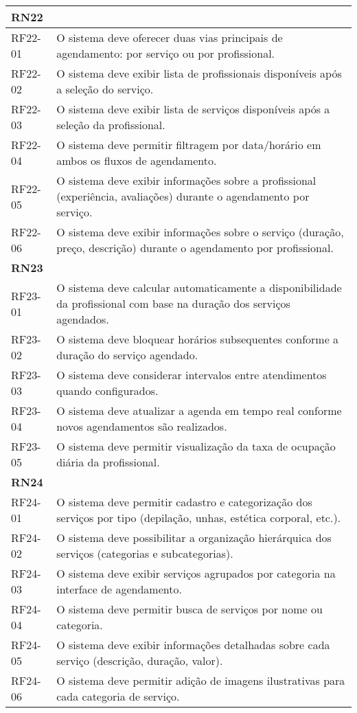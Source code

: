 \begin{longtable}{|p{}|p{}|}
	\multicolumn{2}{|l|}{\textbf{RN22}} \\ \hline
	RF22-01 & O sistema deve oferecer duas vias principais de agendamento: por serviço ou por profissional. \\ \hline
	RF22-02 & O sistema deve exibir lista de profissionais disponíveis após a seleção do serviço. \\ \hline
	RF22-03 & O sistema deve exibir lista de serviços disponíveis após a seleção da profissional. \\ \hline
	RF22-04 & O sistema deve permitir filtragem por data/horário em ambos os fluxos de agendamento. \\ \hline
	RF22-05 & O sistema deve exibir informações sobre a profissional (experiência, avaliações) durante o agendamento por serviço. \\ \hline
	RF22-06 & O sistema deve exibir informações sobre o serviço (duração, preço, descrição) durante o agendamento por profissional. \\ \hline
	
	\multicolumn{2}{|l|}{\textbf{RN23}} \\ \hline
	RF23-01 & O sistema deve calcular automaticamente a disponibilidade da profissional com base na duração dos serviços agendados. \\ \hline
	RF23-02 & O sistema deve bloquear horários subsequentes conforme a duração do serviço agendado. \\ \hline
	RF23-03 & O sistema deve considerar intervalos entre atendimentos quando configurados. \\ \hline
	RF23-04 & O sistema deve atualizar a agenda em tempo real conforme novos agendamentos são realizados. \\ \hline
	RF23-05 & O sistema deve permitir visualização da taxa de ocupação diária da profissional. \\ \hline
	
	\multicolumn{2}{|l|}{\textbf{RN24}} \\ \hline
	RF24-01 & O sistema deve permitir cadastro e categorização dos serviços por tipo (depilação, unhas, estética corporal, etc.). \\ \hline
	RF24-02 & O sistema deve possibilitar a organização hierárquica dos serviços (categorias e subcategorias). \\ \hline
	RF24-03 & O sistema deve exibir serviços agrupados por categoria na interface de agendamento. \\ \hline
	RF24-04 & O sistema deve permitir busca de serviços por nome ou categoria. \\ \hline
	RF24-05 & O sistema deve exibir informações detalhadas sobre cada serviço (descrição, duração, valor). \\ \hline
	RF24-06 & O sistema deve permitir adição de imagens ilustrativas para cada categoria de serviço. \\ \hline
	

\end{longtable}
